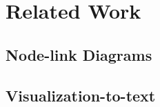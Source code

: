 \section{Related Work}\label{sec:relatedwork}
\subsection{Node-link Diagrams}
\subsection{Visualization-to-text}